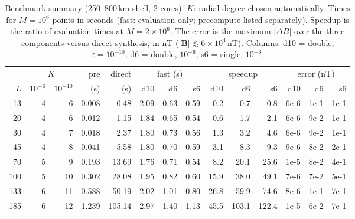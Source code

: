 \begin{table}[!htbp]\centering\footnotesize\setlength{\tabcolsep}{3.6pt}
\caption{Benchmark summary (250--800\,km shell, 2 cores). $K$: radial degree chosen automatically. Times for $M=10^6$
points in seconds (fast: evaluation only; precompute listed separately). Speedup is the ratio of evaluation times at
$M=2\times10^6$. The error is the maximum $|\Delta B|$ over the three components versus direct synthesis, in nT
($|\mathbf B|\lesssim 6\times10^4$\,nT). Columns: d10 = double, $\varepsilon=10^{-10}$; d6 = double, $10^{-6}$; s6 = single, $10^{-6}$.}
\label{tab:speedup}
\begin{tabular}{rrrrr@{\hspace{8pt}}rrr@{\hspace{8pt}}rrr@{\hspace{8pt}}rrr}\toprule
&\multicolumn{2}{c}{$K$}&pre&direct&\multicolumn{3}{c}{fast (s)}&\multicolumn{3}{c}{speedup}&\multicolumn{3}{c}{error (nT)}\\
\cmidrule(lr){2-3}\cmidrule(lr){6-8}\cmidrule(lr){9-11}\cmidrule(lr){12-14}
$L$&$10^{-6}$&$10^{-10}$&(s)&(s)&d10&d6&s6&d10&d6&s6&d10&d6&s6\\\midrule
13 & 4 & 6 & 0.008 & 0.48 & 2.09 & 0.63 & 0.59 & 0.2 & 0.7 & 0.8 & 6e-6 & 1e-1 & 1e-1 \\
20 & 4 & 6 & 0.012 & 1.15 & 1.84 & 0.65 & 0.54 & 0.6 & 1.7 & 2.1 & 6e-6 & 9e-2 & 1e-1 \\
30 & 4 & 7 & 0.018 & 2.37 & 1.80 & 0.73 & 0.56 & 1.3 & 3.2 & 4.6 & 6e-6 & 9e-2 & 1e-1 \\
45 & 4 & 8 & 0.041 & 5.58 & 1.80 & 0.70 & 0.59 & 3.1 & 8.3 & 9.3 & 9e-6 & 8e-2 & 2e-1 \\
70 & 5 & 9 & 0.193 & 13.69 & 1.76 & 0.71 & 0.54 & 8.2 & 20.1 & 25.6 & 1e-5 & 8e-2 & 4e-1 \\
100 & 5 & 10 & 0.302 & 28.08 & 1.95 & 0.82 & 0.60 & 15.9 & 38.0 & 49.1 & 7e-6 & 7e-2 & 5e-1 \\
133 & 6 & 11 & 0.588 & 50.19 & 2.02 & 1.01 & 0.80 & 26.8 & 59.9 & 74.6 & 8e-6 & 1e-1 & 7e-1 \\
185 & 6 & 12 & 1.239 & 105.14 & 2.97 & 1.40 & 1.13 & 45.5 & 103.1 & 122.4 & 1e-5 & 6e-2 & 7e-1 \\
\bottomrule\end{tabular}\end{table}
